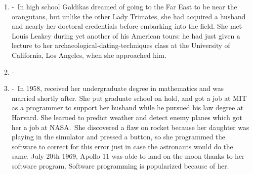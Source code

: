 \documentclass[12pt,a4paper]{article}
\begin{document}
\begin{enumerate}
    \item {} -\ In high school Galdikas dreamed of going to the Far East to be near the orangutans, but unlike the other Lady Trimates, she had acquired a husband and nearly her doctoral credentials before embarking into the field. She met Louis Leakey during yet another of his American tours: he had just given a lecture to her archaeological-dating-techniques class at the University of California, Los Angeles, when she approached him. 
    \item {} -\ 
    \item {} -\ In 1958, received her undergraduate degree in mathematics and was married shortly after. She put graduate school on hold, and got a job at MIT as a programmer to support her husband while he pursued his law degree at Harvard. She learned to predict weather and detect enemy planes which got her a job at NASA.\ She discovered a flaw on rocket because her daughter was playing in the simulator and pressed a button, so she programmed the software to correct for this error just in case the astronauts would do the same. July 20th 1969, Apollo 11 was able to land on the moon thanks to her software program. Software programming is popularized because of her. \href{https://www.wired.com/2015/10/margaret-hamilton-nasa-apollo/}{}

\end{enumerate}
\end{document}
